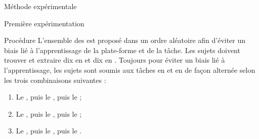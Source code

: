 \documentclass[myfrancais]{mythesis}
\begin{document}
\begin{mychapter}{Méthode expérimentale}
\begin{mysection}{Première expérimentation}
\begin{mysubsection}{Procédure}
				L'ensemble des  est proposé dans un ordre aléatoire afin d'éviter un biais lié à l'apprentissage de la plate-forme et de la tâche.
				Les sujets doivent trouver et extraire dix  en  et dix  en .
				Toujours pour éviter un biais lié à l'apprentissage, les sujets sont soumis aux tâches en  et en  de façon alternée selon les trois combinaisons suivantes :
				\begin{enumerate}
					\item Le  , puis le  , puis le  ;
					\item Le  , puis le  , puis le  ;
					\item Le  , puis le  , puis le  .
				\end{enumerate}


\end{mysubsection}
\end{mysection}
\end{mychapter}
\end{document}
